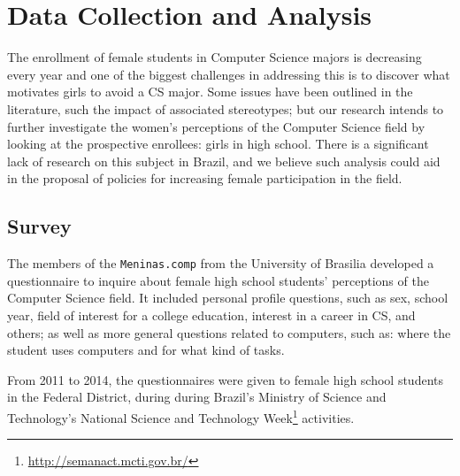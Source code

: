 \section{Data Collection and Analysis}\label{sec:data}
The enrollment of female students in Computer Science majors is decreasing every year and one of the biggest challenges in addressing this is to discover what motivates girls to avoid a CS major. Some issues have been outlined in the literature, such the impact of associated stereotypes; but our research intends to further investigate the women's perceptions of the Computer Science field by looking at the prospective enrollees: girls in high school. There is a significant lack of research on this subject in Brazil, and we believe such analysis could aid in the proposal of policies for increasing female participation in the field.

\subsection{Survey}
The members of the \texttt{Meninas.comp} from the University of Brasilia developed a questionnaire to inquire about female high school students' perceptions of the Computer Science field. It included personal profile questions, such as sex, school year, field of interest for a college education, interest in a career in CS, and others; as well as more general questions related to computers, such as: where the student uses computers and for what kind of tasks.

From 2011 to 2014, the questionnaires were given to female high school students in the Federal District, during during Brazil's Ministry of Science and Technology's National Science and Technology Week\footnote{\url{http://semanact.mcti.gov.br/}} activities.



